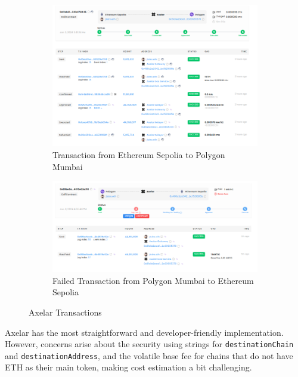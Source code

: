 \documentclass[fleqn,10pt]{olplainarticle}
\begin{document}
\begin{figure}[!h]
	\begin{subfigure}{.5\textwidth}
		\centering
		\includegraphics[width=1\linewidth]{img/AxelarTxSepToMum}
		\caption{Transaction from Ethereum Sepolia to Polygon Mumbai}
		\label{fig:axelartxseptomum}
	\end{subfigure}
	\begin{subfigure}{.5\textwidth}
		\centering
		\includegraphics[width=1\linewidth]{img/AxelarTxMumToSepFail}
		\caption{Failed Transaction from Polygon Mumbai to Ethereum Sepolia}
		\label{fig:axelartxmumtosepfail}
	\end{subfigure}
	\caption{Axelar Transactions}
	\label{fig:inputIMG}
\end{figure}

Axelar has the most straightforward and developer-friendly implementation. However, concerns arise about the security using strings for \texttt{destinationChain} and \texttt{destinationAddress}, and the volatile base fee for chains that do not have ETH as their main token, making cost estimation a bit challenging.
\end{document}
